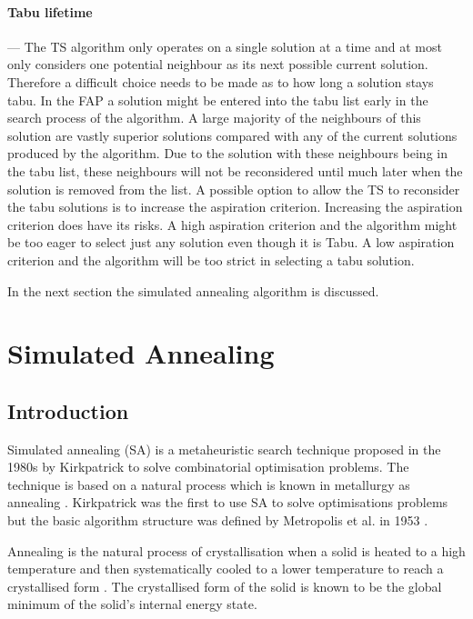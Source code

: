\paragraph{Tabu lifetime}
--- The TS algorithm only operates on a single solution at a time and at most only considers one potential neighbour as its next possible current solution. Therefore a difficult choice needs to be made as to how long a solution stays tabu. In the FAP a solution might be entered into the tabu list early in the search process of the algorithm. A large majority of the neighbours of this solution are vastly superior solutions compared with any of the current solutions produced by the algorithm. Due to the solution with these neighbours being in the tabu list, these neighbours will not be reconsidered until much later when the solution is removed from the list. A possible option to allow the TS to reconsider the tabu solutions is to increase the aspiration criterion. Increasing the aspiration criterion does have its risks. A high aspiration criterion and the algorithm might be too eager to select just any solution even though it is Tabu. A low aspiration criterion and the algorithm will be too strict in selecting a tabu solution.

In the next section the simulated annealing algorithm is discussed.
\section{Simulated Annealing}
\label{sec:simulatedannealing}

\subsection{Introduction}
\label{sec:SAIntroduction}
Simulated annealing (SA) is a metaheuristic search technique proposed in the 1980s by Kirkpatrick to solve combinatorial optimisation problems. The technique is based on a natural process which is known in metallurgy as annealing \cite{CurveFittingSA,SASingleMultiObj,TempCyclingSA,ChaosSA}. Kirkpatrick was the first to use SA to solve optimisations problems but the basic algorithm structure was defined by Metropolis et al. in 1953 \cite{CurveFittingSA,VeryFastSAImageEnchancement}.

Annealing is the natural process of crystallisation when a solid is heated to a high temperature and then systematically cooled to a lower temperature to reach a crystallised form \cite{CurveFittingSA,NewSAs,MobileRobotSA,ConstantTempSA}. The crystallised form of the solid is known to be the global minimum of the solid's internal energy state. 

